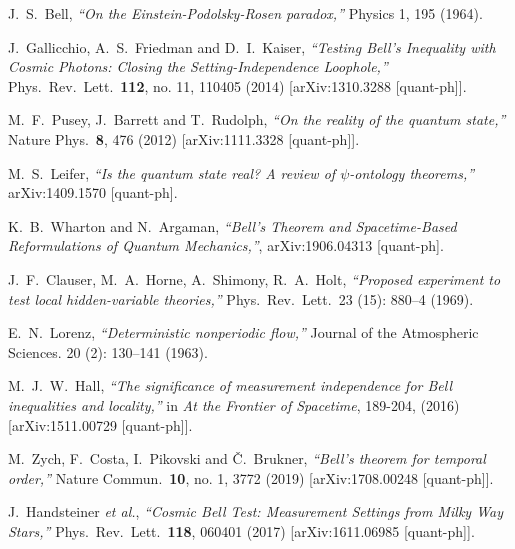 \documentclass[12pt]{article}
\begin{document}
\begin{thebibliography}{99}
\small{


 J.~S.~Bell, {\sl ``On the Einstein-Podolsky-Rosen paradox,''} Physics 1, 195 (1964).

  J.~Gallicchio, A.~S.~Friedman and D.~I.~Kaiser,
  {\sl ``Testing Bell’s Inequality with Cosmic Photons: Closing the Setting-Independence Loophole,''}
  Phys.\ Rev.\ Lett.\  {\bf 112}, no. 11, 110405 (2014)
  [arXiv:1310.3288 [quant-ph]].
  
  
  M.~F.~Pusey, J.~Barrett and T.~Rudolph,
  {\sl ``On the reality of the quantum state,''}
  Nature Phys.\  {\bf 8}, 476 (2012)
  [arXiv:1111.3328 [quant-ph]].
  
  M.~S.~Leifer,
  {\sl ``Is the quantum state real? A review of $\psi$-ontology theorems,''}
  arXiv:1409.1570 [quant-ph].
 
  K.~B.~Wharton and N.~Argaman, {\sl ``Bell's Theorem and Spacetime-Based Reformulations of Quantum Mechanics,''}, arXiv:1906.04313 [quant-ph].


  J.~F.~Clauser, M.~A.~Horne, A.~Shimony, R.~A.~Holt, {\sl ``Proposed experiment to test local hidden-variable theories,''} Phys.\ Rev.\ Lett.\ 23 (15): 880--4 (1969).
 
  E.~N.~Lorenz,  {\sl ``Deterministic nonperiodic flow,''} Journal of the Atmospheric Sciences. 20 (2): 130–141 (1963).

  
   M.~J.~W.~Hall, {\sl ``The significance of measurement independence for Bell inequalities and locality,''} in {\sl At the Frontier of Spacetime},  189-204, (2016) [arXiv:1511.00729 [quant-ph]].

  M.~Zych, F.~Costa, I.~Pikovski and Č.~Brukner,
  {\sl ``Bell’s theorem for temporal order,''}
  Nature Commun.\  {\bf 10}, no. 1, 3772 (2019)
  [arXiv:1708.00248 [quant-ph]].

  J.~Handsteiner {\it et al.},
  {\sl ``Cosmic Bell Test: Measurement Settings from Milky Way Stars,''}
  Phys.\ Rev.\ Lett.\  {\bf 118}, 060401 (2017)  
  [arXiv:1611.06985 [quant-ph]].
  
}
\end{thebibliography}
\end{document}
